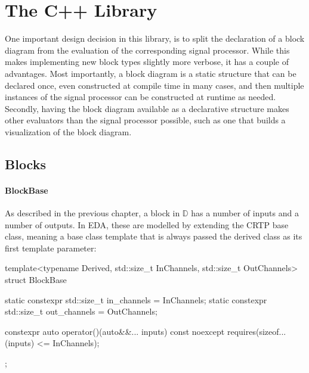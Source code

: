\chapter{The C++ Library}

% 

One important design decision in this library, is to split the declaration of a block diagram from the
evaluation of the corresponding signal processor. While this makes implementing new block types slightly more
verbose, it has a couple of advantages. Most importantly, a block diagram is a static structure that can be
declared once, even constructed at compile time in many cases, and then multiple instances of the signal
processor can be constructed at runtime as needed. Secondly, having the block diagram available as a
declarative structure makes other evaluators than the signal processor possible, such as one that builds a
visualization of the block diagram.

\section{Blocks}

\subsubsection{BlockBase}

As described in the previous chapter, a block in $\mathbb D$ has a number of inputs and a number of
outputs. In EDA, these are modelled by extending the  CRTP\footnotemark{} base class, meaning a base class
template that is always passed the derived class as its first template parameter:


\begin{cppcodenl}
template<typename Derived, std::size_t InChannels, std::size_t OutChannels>
struct BlockBase {
  static constexpr std::size_t in_channels = InChannels;
  static constexpr std::size_t out_channels = OutChannels;

  constexpr auto operator()(auto&&... inputs) const noexcept 
    requires(sizeof...(inputs) <= InChannels);
};
\end{cppcodenl}

